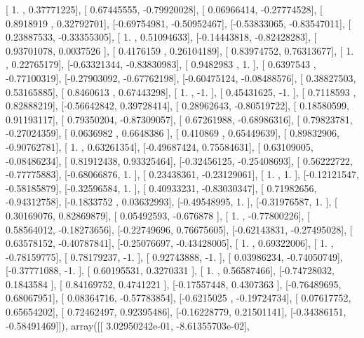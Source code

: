\documentclass{article}
\begin{document}
       [ 1.        ,  0.37771225],
       [ 0.67445555, -0.79920028],
       [ 0.06966414, -0.27774528],
       [ 0.8918919 ,  0.32792701],
       [-0.69754981, -0.50952467],
       [-0.53833065, -0.83547011],
       [ 0.23887533, -0.33355305],
       [ 1.        ,  0.51094633],
       [-0.14443818, -0.82428283],
       [ 0.93701078,  0.0037526 ],
       [ 0.4176159 ,  0.26104189],
       [ 0.83974752,  0.76313677],
       [ 1.        ,  0.22765179],
       [-0.63321344, -0.83830983],
       [ 0.9482983 ,  1.        ],
       [ 0.6397543 , -0.77100319],
       [-0.27903092, -0.67762198],
       [-0.60475124, -0.08488576],
       [ 0.38827503,  0.53165885],
       [ 0.8460613 ,  0.67443298],
       [ 1.        , -1.        ],
       [ 0.45431625, -1.        ],
       [ 0.7118593 ,  0.82888219],
       [-0.56642842,  0.39728414],
       [ 0.28962643, -0.80519722],
       [ 0.18580599,  0.91193117],
       [ 0.79350204, -0.87309057],
       [ 0.67261988, -0.68986316],
       [ 0.79823781, -0.27024359],
       [ 0.0636982 ,  0.6648386 ],
       [ 0.410869  ,  0.65449639],
       [ 0.89832906, -0.90762781],
       [ 1.        ,  0.63261354],
       [-0.49687424,  0.75584631],
       [ 0.63109005, -0.08486234],
       [ 0.81912438,  0.93325464],
       [-0.32456125, -0.25408693],
       [ 0.56222722, -0.77775883],
       [-0.68066876,  1.        ],
       [ 0.23438361, -0.23129061],
       [ 1.        ,  1.        ],
       [-0.12121547, -0.58185879],
       [-0.32596584,  1.        ],
       [ 0.40933231, -0.83030347],
       [ 0.71982656, -0.94312758],
       [-0.1833752 ,  0.03632993],
       [-0.49548995,  1.        ],
       [-0.31976587,  1.        ],
       [ 0.30169076,  0.82869879],
       [ 0.05492593, -0.676878  ],
       [ 1.        , -0.77800226],
       [ 0.58564012, -0.18273656],
       [-0.22749696,  0.76675605],
       [-0.62143831, -0.27495028],
       [ 0.63578152, -0.40787841],
       [-0.25076697, -0.43428005],
       [ 1.        ,  0.69322006],
       [ 1.        , -0.78159775],
       [ 0.78179237, -1.        ],
       [ 0.92743888, -1.        ],
       [ 0.03986234, -0.74050749],
       [-0.37771088, -1.        ],
       [ 0.60195531,  0.3270331 ],
       [ 1.        ,  0.56587466],
       [-0.74728032,  0.1843584 ],
       [ 0.84169752,  0.4741221 ],
       [-0.17557448,  0.4307363 ],
       [-0.76489695,  0.68067951],
       [ 0.08364716, -0.57783854],
       [-0.6215025 , -0.19724734],
       [ 0.07617752,  0.65654202],
       [ 0.72462497,  0.92395486],
       [-0.16228779,  0.21501141],
       [-0.34386151, -0.58491469]]), array([[  3.02950242e-01,  -8.61355703e-02],
\end{document}
